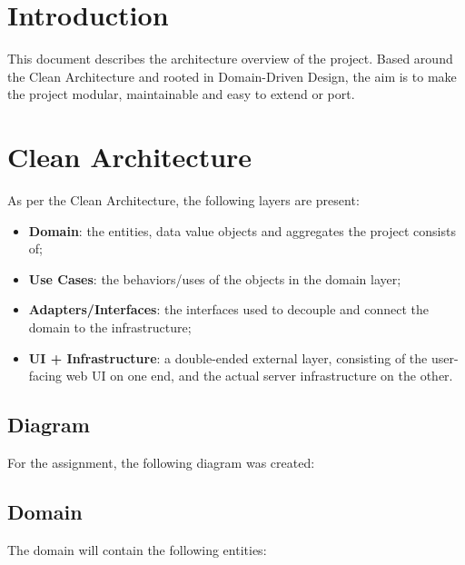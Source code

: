 \documentclass[12pt, a4paper]{article}
\begin{document}

\section{Introduction}

This document describes the architecture overview of the project.
Based around the Clean Architecture and rooted in Domain-Driven Design, the aim is to make the project modular, maintainable and easy to extend or port.

\section{Clean Architecture}

As per the Clean Architecture, the following layers are present:

\begin{itemize}
\item \textbf{Domain}: the entities, data value objects and aggregates the project consists of;
\item \textbf{Use Cases}: the behaviors/uses of the objects in the domain layer;
\item \textbf{Adapters/Interfaces}: the interfaces used to decouple and connect the domain to the infrastructure;
\item \textbf{UI + Infrastructure}: a double-ended external layer, consisting of the user-facing web UI on one end, and the actual server infrastructure on the other.
\end{itemize}

\subsection{Diagram}

For the assignment, the following diagram was created:



\subsection{Domain}

The domain will contain the following entities:
\end{document}
